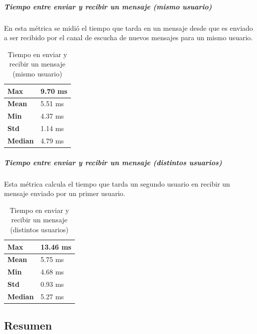\subparagraph{Tiempo entre enviar y recibir un mensaje (mismo usuario)}

En esta métrica se midió el tiempo que tarda en un mensaje desde que es enviado a ser recibido por el canal de escucha de nuevos mensajes para un mismo usuario.

\setlength\tabcolsep{1pt}
\begin{table}[!htbp]
    \centering
    \begin{tabular}{|m{5em}|m{5em}|}
    \hline
    \textbf{Max} & 9.70 ms \\
    \hline
    \textbf{Mean} & 5.51 ms \\
    \hline
    \textbf{Min} & 4.37 ms \\
    \hline
    \textbf{Std} & 1.14 ms \\
    \hline
    \textbf{Median} & 4.79 ms \\
    \hline
    \end{tabular}
    \caption{Tiempo en enviar y recibir un mensaje (mismo usuario)}
\end{table}

\subparagraph{Tiempo entre enviar y recibir un mensaje (distintos usuarios)}

Esta métrica calcula el tiempo que tarda un segundo usuario en recibir un mensaje enviado por un primer usuario.

\setlength\tabcolsep{1pt}
\begin{table}[!htbp]
    \centering
    \begin{tabular}{|m{5em}|m{5em}|}
    \hline
    \textbf{Max} & 13.46 ms \\
    \hline
    \textbf{Mean} & 5.75 ms \\
    \hline
    \textbf{Min} & 4.68 ms \\
    \hline
    \textbf{Std} & 0.93 ms \\
    \hline
    \textbf{Median} & 5.27 ms \\
    \hline
    \end{tabular}
    \caption{Tiempo en enviar y recibir un mensaje (distintos usuarios)}
\end{table}

\subsection{Resumen}

